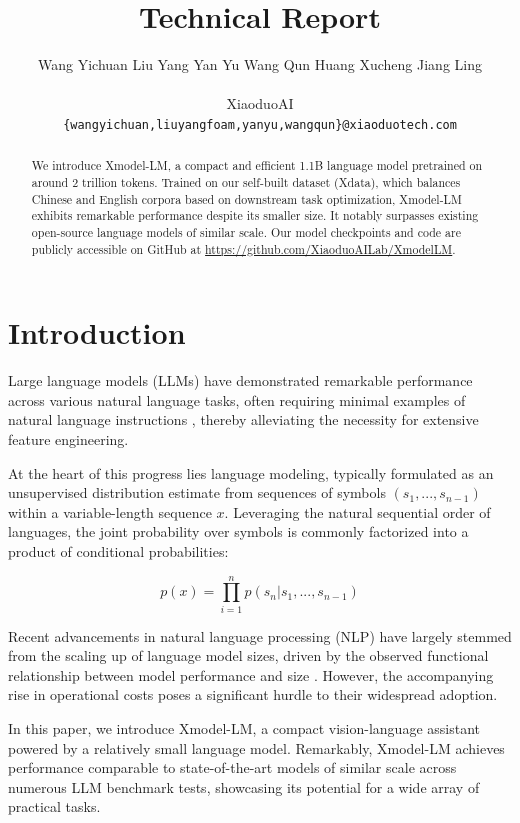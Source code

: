 \documentclass{article}
\title{\llm Technical Report}
\author{
Wang Yichuan
\hspace{0.8em}Liu Yang
\hspace{0.8em}Yan Yu
\hspace{0.8em}Wang Qun
\hspace{0.8em}Huang Xucheng
\hspace{0.8em}Jiang Ling \\ \\
XiaoduoAI \\
\texttt{\{wangyichuan,liuyangfoam,yanyu,wangqun\}@xiaoduotech.com}
}
\date{}
\newcommand{\llm}{Xmodel-LM\xspace}
\begin{document}
\maketitle

\begin{abstract}

We introduce \llm, a compact and efficient 1.1B language model pretrained on around 2 trillion tokens. Trained on our self-built dataset (Xdata), which balances Chinese and English corpora based on downstream task optimization, \llm exhibits remarkable performance despite its smaller size. It notably surpasses existing open-source language models of similar scale. Our model checkpoints and code are publicly accessible on GitHub at \url{https://github.com/XiaoduoAILab/XmodelLM}.

\end{abstract}

\section{Introduction}

Large language models (LLMs) have demonstrated remarkable performance across various natural language tasks, often requiring minimal examples of natural language instructions \citep{brown2020language}, thereby alleviating the necessity for extensive feature engineering.

At the heart of this progress lies language modeling, typically formulated as an unsupervised distribution estimate from sequences of symbols $(s_1, ..., s_{n-1})$ within a variable-length sequence $x$. Leveraging the natural sequential order of languages, the joint probability over symbols is commonly factorized into a product of conditional probabilities:

$$
    p(x) = 
    \prod_{i=1}^{n} p ( s_n | s_1, ..., s_{n-1})
$$

Recent advancements in natural language processing (NLP) have largely stemmed from the scaling up of language model sizes, driven by the observed functional relationship between model performance and size \citep{henighan2020scaling}. However, the accompanying rise in operational costs poses a significant hurdle to their widespread adoption.

In this paper, we introduce \llm, a compact vision-language assistant powered by a relatively small language model. Remarkably, \llm achieves performance comparable to state-of-the-art models of similar scale across numerous LLM benchmark tests, showcasing its potential for a wide array of practical tasks.
\end{document}

